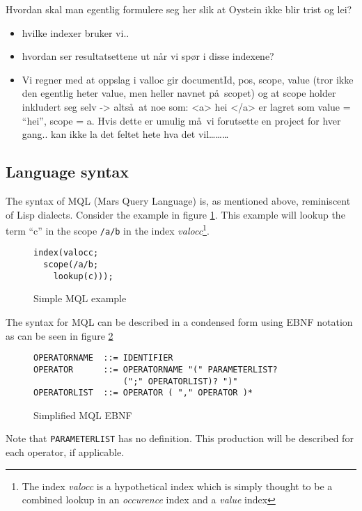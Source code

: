 Hvordan skal man egentlig formulere seg her slik at Oystein ikke blir trist og
lei?

\begin{itemize}
  \item hvilke indexer bruker vi..
  \item hvordan ser resultatsettene ut n\aa r vi sp\o r i disse indexene?
  \item Vi regner med at oppslag i valloc gir {documentId, pos, scope, value} (tror ikke den egentlig heter value,
  men heller navnet p\aa~scopet) og at scope holder inkludert seg selv -> alts\aa~at noe som: <a> hei </a> er
  lagret som {value = ``hei'', scope = a}. Hvis dette er umulig m\aa~vi forutsette en project for hver gang.. kan
  ikke la det feltet hete hva det vil\ldots\ldots\ldots
\end{itemize}

\subsection{Language syntax}
The syntax of MQL (Mars Query Language) is, as mentioned above, reminiscent of
Lisp dialects. Consider the example in figure \ref{figure:mql:op_example}. This
example will lookup the term ``c'' in the scope \texttt{/a/b} in the index
\textit{valocc}\footnote{The index \textit{valocc} is a hypothetical index
which is simply thought to be a combined lookup in an \textit{occurence}
index and a \textit{value} index}.

\begin{figure}[!h]
\centering
\begin{Verbatim}
index(valocc; 
  scope(/a/b;
    lookup(c)));
\end{Verbatim}
\caption{Simple MQL example}
\label{figure:mql:op_example}
\end{figure}

The syntax for MQL can be described in a condensed form using EBNF notation as
can be seen in figure \ref{figure:mql:ebnf}
\begin{figure}[!h]
\centering
\begin{Verbatim}
OPERATORNAME  ::= IDENTIFIER
OPERATOR      ::= OPERATORNAME "(" PARAMETERLIST? 
                  (";" OPERATORLIST)? ")"
OPERATORLIST  ::= OPERATOR ( "," OPERATOR )*
\end{Verbatim}
\caption{Simplified MQL EBNF}
\label{figure:mql:ebnf}
\end{figure}

Note that \texttt{PARAMETERLIST} has no definition. This production will be
described for each operator, if applicable.

